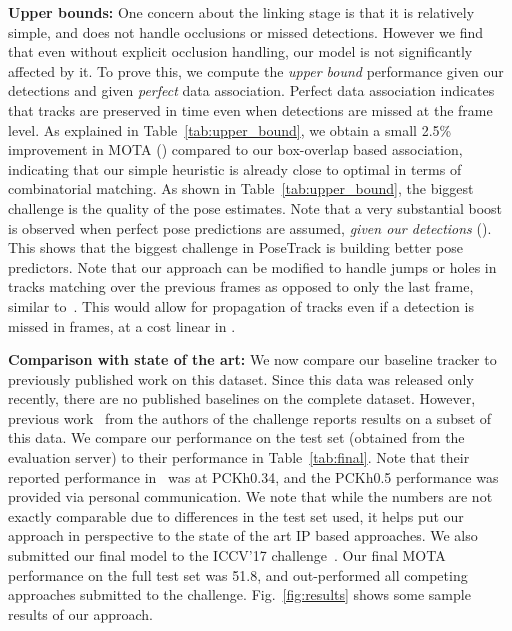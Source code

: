 \documentclass[10pt,twocolumn,letterpaper]{article}
\begin{document}
{\noindent \bf Upper bounds:}\label{sec:expts:upperbounds}
One concern about the linking stage is that it is relatively simple, and does not handle occlusions or missed detections.
However we find that even without explicit occlusion handling, our model is not significantly affected by it.
To prove this, we compute the {\em upper bound} performance given our detections and given {\em perfect} data association. Perfect data association indicates that tracks are preserved in time even when detections are missed at the frame level. As explained in Table~\ref{tab:upper_bound}, we obtain a small 2.5\% improvement in MOTA () compared to our box-overlap based association, indicating that our simple heuristic is already close to optimal in terms of combinatorial matching. As shown in Table~\ref{tab:upper_bound}, the biggest challenge is the quality of the pose estimates. Note that a very substantial boost is observed when perfect pose predictions are assumed, {\em given our detections} (). This shows that the biggest challenge in PoseTrack is building better pose predictors.
Note that
our approach can be modified to handle jumps or holes in tracks
matching over the previous  frames as opposed to only the last frame, similar to~\cite{pirsiavash2011globally}. This would allow for propagation of tracks even if a detection is missed in  frames, at a cost linear in .



{\noindent \bf Comparison with state of the art:}
We now compare our baseline tracker to previously published work on this dataset. Since this data was released only recently,
there are no published baselines on the complete dataset. However, previous work~\cite{iqbal2016pose} from the authors of the challenge reports results on a subset of this data. We compare our performance on the test set (obtained from the evaluation server) to their performance in Table~\ref{tab:final}.
Note that their reported performance in~\cite{iqbal2016pose} was at PCKh0.34, and the PCKh0.5 performance was provided via personal
communication.
We note that while the numbers are not exactly comparable due to differences in the test set used, it helps put our approach in
perspective to the state of the art IP based approaches.
We also submitted our final model to the ICCV'17 challenge~\cite{posetrack_challenge}.
Our final MOTA performance on the full test set was 51.8, and 
out-performed all competing approaches submitted to the challenge. Fig.~\ref{fig:results} shows some sample results of our approach.
\end{document}
